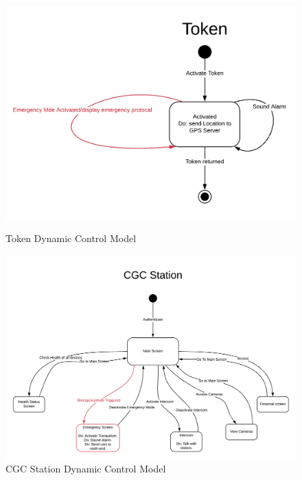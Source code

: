 \documentclass[12pt]{article}
\begin{document}
    \begin{figure}[H]
 		{\includegraphics[scale=0.30]{Token.png}}
 		\caption{Token Dynamic Control Model}
  		\label{fig:normal}
    \end{figure}

    \begin{figure}[H]
 		\centerline{\includegraphics[scale=0.20]{CGCStation.png}}
 		\caption{CGC Station Dynamic Control Model}
  		\label{fig:normal}
    \end{figure}
\end{document}
